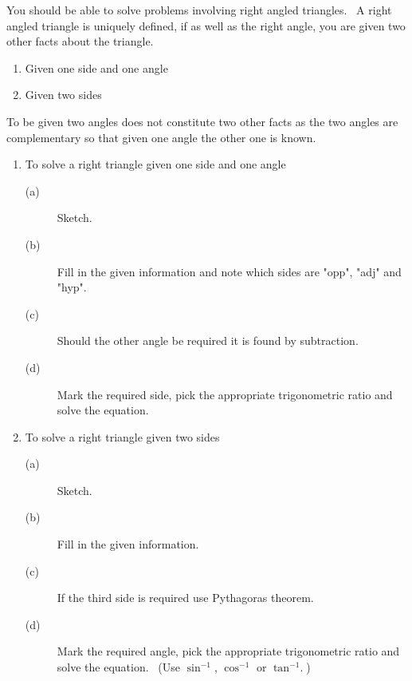 You should be able to solve problems involving right angled triangles. \ A
right angled triangle is uniquely defined, if as well as the right angle, you are given two other facts about the triangle. 


\begin{enumerate}
\item Given one side and one angle 

\item Given two sides \end{enumerate}


To be given two angles does not constitute two other facts as the two angles are complementary so that given one angle the other one is known.



\begin{enumerate}
\item To solve a right triangle given one side and one angle 


\begin{description}
\item [(a)] Sketch. 

\item [(b)]
Fill in the given information and note which sides are "opp", "adj" and "hyp". 

\item [(c)]
Should the other angle be required it is found by subtraction. 

\item [(d)]
Mark the required side, pick the appropriate trigonometric ratio and solve the equation. \end{description}

\item To solve a right triangle given two sides 


\begin{description}
\item [(a)] Sketch. 

\item [(b)]
Fill in the given information. 

\item [(c)] If the third side
is required use Pythagoras theorem. 

\item [(d)] Mark the required
angle, pick the appropriate trigonometric ratio and solve the equation. \ (Use $\sin ^{ -1}$, $\cos ^{ -1}$ or $\tan ^{ -1}\text{.}$) \end{description}\end{enumerate}


